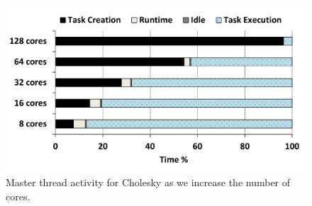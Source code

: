 \begin{figure}[t!]%
	\centering
	\includegraphics[width=0.75\columnwidth]{figures/master_thread.pdf}
	\caption{Master thread activity for Cholesky as we increase the number of cores.}
	\label{fig:master_thread}%
\end{figure}

